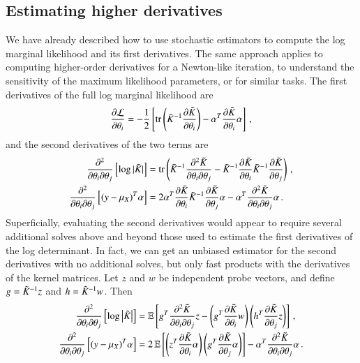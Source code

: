 \subsection{Estimating higher derivatives}\label{sgpsec:hod}

We have already described how to use stochastic estimators to compute the log
marginal likelihood and its first derivatives. The same approach applies to
computing higher-order derivatives for a Newton-like iteration, to understand
the sensitivity of the maximum likelihood parameters, or for similar tasks. The
first derivatives of the full log marginal likelihood are
\begin{equation}\label{eqn:loglikderiv}
  \frac{\partial \mathcal{L}}{\partial \theta_i} = -\frac{1}{2} \left[\operatorname{tr}\left(\tilde{K}_{}^{-1} \frac{\partial \tilde{K}_{}}{\partial \theta_i}\right) - \alpha^T 
  \frac{\partial \tilde{K}_{}}{\partial \theta_i} \alpha\right]\,,
\end{equation}
and the second derivatives of the two terms are
\begin{align}
  \frac{\partial^2}{\partial \theta_i \partial \theta_j} \left[ \log |\tilde K|
  \right] &= \operatorname{tr}\left(\tilde{K}_{}^{-1} \frac{\partial^2 \tilde{K}_{}} {\partial \theta_i
  \partial \theta_j} - \tilde{K}_{}^{-1} \frac{\partial \tilde{K}_{}}{\partial \theta_i}
  \tilde{K}_{}^{-1} \frac{\partial \tilde{K}_{}}{\partial \theta_j}\right)\,, \\
  \frac{\partial^2}{\partial \theta_i \partial \theta_j} \left[ (y-\mu_X)^T
  \alpha \right] &= 2\alpha^T \frac{\partial \tilde{K}_{}}{\partial \theta_i}
  \tilde{K}_{}^{-1}\frac{\partial \tilde K}{\partial \theta_j} \alpha - \alpha^T 
  \frac{\partial^2 \tilde{K}_{}} {\partial \theta_i \partial \theta_j}\alpha\,.
\end{align}
Superficially, evaluating the second derivatives would appear to require several
additional solves above and beyond those used to estimate the first derivatives
of the log determinant.  In fact, we can get an unbiased estimator for the
second derivatives with no additional solves, but only fast products with the
derivatives of the kernel matrices.  Let $z$ and $w$ be independent probe
vectors, and define $g = \tilde{K}_{}^{-1}z$ and $h = \tilde{K}_{}^{-1}w$.  Then
\begin{align}
  \frac{\partial^2}{\partial \theta_i \partial \theta_j} \left[\log\left\lvert\tilde{K}_{}\right\rvert
  \right] &= \operatorname{\mathbb{E}} \left[ g^T \frac{\partial^2 \tilde{K}_{}} {\partial \theta_i
  \partial \theta_j} z - \left( g^T \frac{\partial \tilde{K}_{}}{\partial \theta_i}
  w \right) \left( h^T \frac{\partial \tilde{K}_{}}{\partial \theta_j} z \right)
  \right]\,, \\
  \frac{\partial^2}{\partial \theta_i \partial \theta_j} \left[ (y-\mu_X)^T
  \alpha \right] &= 2 \operatorname{\mathbb{E}} \left[\left( z^T \frac{\partial \tilde{K}_{}}{\partial
  \theta_i} \alpha \right) \left( g^T \frac{\partial \tilde{K}_{}}{\partial \theta_j}
  \alpha \right)\right] - \alpha^T \frac{\partial^2 \tilde{K}_{}} {\partial \theta_i
  \partial \theta_j}\alpha\,.
\end{align}
